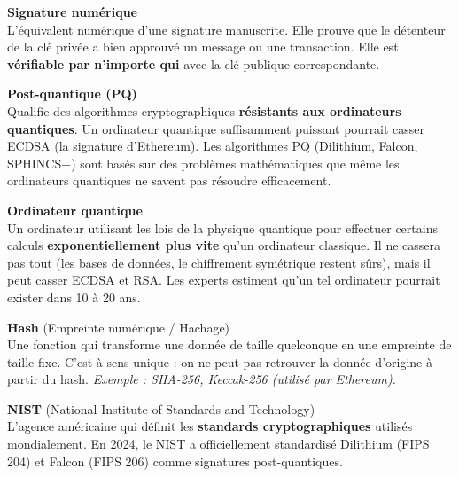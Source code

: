 \documentclass[12pt, a4paper]{article}
\begin{document}
\begin{tcolorbox}[colback=gray!4, colframe=gray!50, breakable]

\textbf{Signature numérique}\\
\hspace*{1em} L'équivalent numérique d'une signature manuscrite. Elle prouve que le détenteur de
la clé privée a bien approuvé un message ou une transaction. Elle est \textbf{vérifiable par
n'importe qui} avec la clé publique correspondante.

\vspace{0.4cm}

\textbf{Post-quantique (PQ)}\\
\hspace*{1em} Qualifie des algorithmes cryptographiques \textbf{résistants aux ordinateurs
quantiques}. Un ordinateur quantique suffisamment puissant pourrait casser ECDSA (la signature
d'Ethereum). Les algorithmes PQ (Dilithium, Falcon, SPHINCS+) sont basés sur des problèmes
mathématiques que même les ordinateurs quantiques ne savent pas résoudre efficacement.

\vspace{0.4cm}

\textbf{Ordinateur quantique}\\
\hspace*{1em} Un ordinateur utilisant les lois de la physique quantique pour effectuer certains
calculs \textbf{exponentiellement plus vite} qu'un ordinateur classique. Il ne cassera pas tout
(les bases de données, le chiffrement symétrique restent sûrs), mais il peut casser ECDSA et RSA.
Les experts estiment qu'un tel ordinateur pourrait exister dans 10 à 20 ans.

\vspace{0.4cm}

\textbf{Hash} (Empreinte numérique / Hachage)\\
\hspace*{1em} Une fonction qui transforme une donnée de taille quelconque en une empreinte de
taille fixe. C'est à sens unique : on ne peut pas retrouver la donnée d'origine à partir du hash.
\textit{Exemple : SHA-256, Keccak-256 (utilisé par Ethereum).}

\vspace{0.4cm}

\textbf{NIST} (National Institute of Standards and Technology)\\
\hspace*{1em} L'agence américaine qui définit les \textbf{standards cryptographiques} utilisés
mondialement. En 2024, le NIST a officiellement standardisé Dilithium (FIPS 204) et Falcon
(FIPS 206) comme signatures post-quantiques.


\end{tcolorbox}
\end{document}
